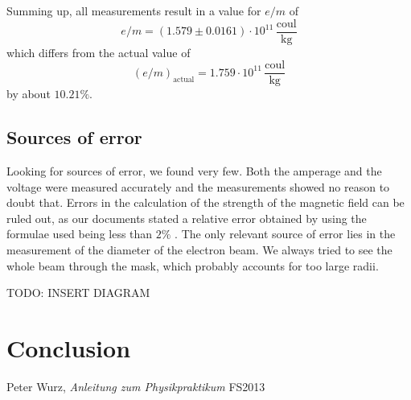 \documentclass{scrreprt}
\newcommand{\unit}[1]{\ensuremath{\, \mathrm{#1}}}
\begin{document}
Summing up, all measurements result in a value for $e/m$ of
\begin{equation}
e/m = \left( 1.579 \pm 0.0161 \right)\cdot 10^{11} \unit{\frac{coul}{kg}}
\end{equation}
which differs from the actual value of 
\begin{equation}
(e/m)_{\text{actual}} = 1.759 \cdot 10^{11} \unit{\frac{coul}{kg}}
\end{equation}
by about $10.21\%$.

\subsection{Sources of error}
\label{sec:error}
Looking for sources of error, we found very few. Both the amperage and the voltage were measured accurately and the measurements showed no reason to doubt that. Errors in the calculation of the strength of the magnetic field can be ruled out, as our documents stated a relative error obtained by using the formulae used being less than $2\%$ \cite[p. 174]{physcript13}. 
The only relevant source of error lies in the measurement of the diameter of the electron beam. We always tried to see the whole beam through the mask, which probably accounts for too large radii. 

TODO: INSERT DIAGRAM

\section{Conclusion}

\begin{thebibliography}{9}

  Peter Wurz,
  \emph{Anleitung zum Physikpraktikum}
  FS2013

\end{thebibliography}
\end{document}
